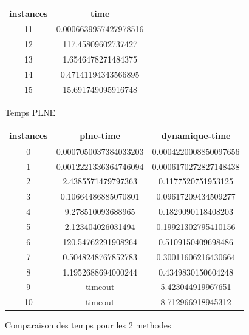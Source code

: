 \documentclass[a4paper]{memoir}
\begin{document}
\begin{figure}
  \begin{center}
    \begin{tabular}{|c||c|}
    \hline
    instances & time\\ 
    \hline
    11 & 0.0006639957427978516 \\ 
    \hline
    12 & 117.45809602737427 \\ 
    \hline
    13 & 1.6546478271484375 \\ 
    \hline
    14 & 0.47141194343566895 \\ 
    \hline
    15 & 15.691749095916748 \\ 
    \hline
    \end{tabular}
    \caption{Temps PLNE}
  \end{center}
\end{figure}

\begin{figure}
  \begin{center}
\begin{tabular}{|c||c||c|}
\hline
instances & plne-time & dynamique-time \\ 
\hline
0 & 0.0007050037384033203 & 0.0004220008850097656 \\ 
\hline
1 & 0.0012221336364746094 & 0.0006170272827148438 \\ 
\hline
2 & 2.4385571479797363 & 0.1177520751953125 \\ 
\hline
3 & 0.10664486885070801 & 0.09617209434509277 \\ 
\hline
4 & 9.278510093688965 & 0.1829090118408203 \\ 
\hline
5 & 2.123404026031494 & 0.19921302795410156 \\ 
\hline
6 & 120.54762291908264 & 0.5109150409698486 \\ 
\hline
7 & 0.5048248767852783 & 0.30011606216430664 \\ 
\hline
8 & 1.1952688694000244 & 0.4349830150604248 \\ 
\hline
9 & timeout & 5.423044919967651 \\ 
\hline
10 & timeout & 8.712966918945312 \\ 
\hline
\end{tabular}

\caption{Comparaison des temps pour les 2 methodes}
  \end{center}
  \end{figure}
\end{document}
